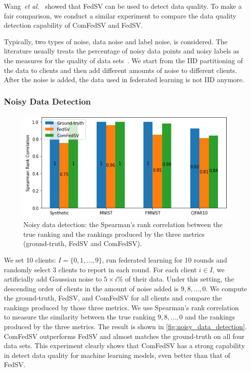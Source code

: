 Wang~\textit{et al.}~\cite{wang2020principled} showed that FedSV can be used to detect data quality.  To make a fair comparison, we conduct a similar experiment to compare the data quality detection capability of ComFedSV and FedSV.

Typically, two types of noise, data noise and label noise, is considered. The literature usually treats the percentage of noisy data points and noisy labels as the measures for the quality of data sets~\cite{liebchen2008data, karimi2020deep}. 
We start from the IID partitioning of the data to clients and then add different amounts of noise to different clients. After the noise is added, the data used in federated learning is not IID anymore.

\subsubsection{Noisy Data Detection}

\begin{figure}[t]
    \centering
    \includegraphics[width=.7\linewidth]{./figures/data_noise_detection.png}
    \caption{Noisy data detection: the Spearman’s  rank  correlation between the true ranking and the rankings produced by the three metrics (ground-truth, FedSV and ComFedSV).}
    \label{fig:noisy_data_detection}
\end{figure}

We set 10 clients: $I = \{0, 1, \dots, 9\}$, run federated learning for 10 rounds and randomly select 3 clients to report in each round. For each client $i \in I$, we artificially add Gaussian noise to $5\times i\%$ of their data. Under this setting, the descending order of clients in the amount of noise added is $9, 8, \dots, 0$.  We compute the ground-truth, FedSV, and ComFedSV for all clients and compare the rankings produced by those three metrics. We use Spearman's rank correlation~\cite{zar1972significance,zar2005spearman} to measure the similarity between the true ranking $9, 8, \dots, 0$ and the rankings produced by the three metrics. The result is shown in \autoref{fig:noisy_data_detection}. ComFedSV outperforms FedSV and almost matches the ground-truth on all four data sets. This experiment clearly shows that ComFedSV has a strong capability in detect data quality for machine learning models, even better than that of FedSV.

